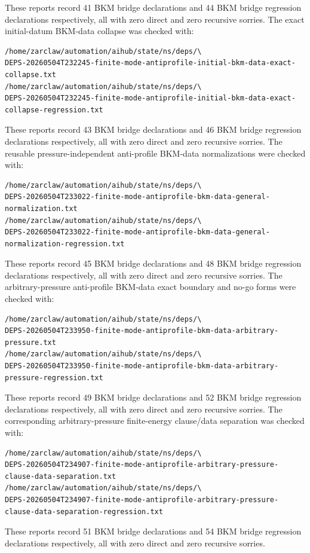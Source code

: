 \documentclass[11pt]{article}
\begin{document}
These reports record 41 BKM bridge declarations and 44 BKM bridge regression
declarations respectively, all with zero direct and zero recursive sorries.
The exact initial-datum BKM-data collapse was checked with:
\begin{verbatim}
/home/zarclaw/automation/aihub/state/ns/deps/\
DEPS-20260504T232245-finite-mode-antiprofile-initial-bkm-data-exact-collapse.txt
/home/zarclaw/automation/aihub/state/ns/deps/\
DEPS-20260504T232245-finite-mode-antiprofile-initial-bkm-data-exact-collapse-regression.txt
\end{verbatim}
These reports record 43 BKM bridge declarations and 46 BKM bridge regression
declarations respectively, all with zero direct and zero recursive sorries.
The reusable pressure-independent anti-profile BKM-data normalizations were
checked with:
\begin{verbatim}
/home/zarclaw/automation/aihub/state/ns/deps/\
DEPS-20260504T233022-finite-mode-antiprofile-bkm-data-general-normalization.txt
/home/zarclaw/automation/aihub/state/ns/deps/\
DEPS-20260504T233022-finite-mode-antiprofile-bkm-data-general-normalization-regression.txt
\end{verbatim}
These reports record 45 BKM bridge declarations and 48 BKM bridge regression
declarations respectively, all with zero direct and zero recursive sorries.
The arbitrary-pressure anti-profile BKM-data exact boundary and no-go forms
were checked with:
\begin{verbatim}
/home/zarclaw/automation/aihub/state/ns/deps/\
DEPS-20260504T233950-finite-mode-antiprofile-bkm-data-arbitrary-pressure.txt
/home/zarclaw/automation/aihub/state/ns/deps/\
DEPS-20260504T233950-finite-mode-antiprofile-bkm-data-arbitrary-pressure-regression.txt
\end{verbatim}
These reports record 49 BKM bridge declarations and 52 BKM bridge regression
declarations respectively, all with zero direct and zero recursive sorries.
The corresponding arbitrary-pressure finite-energy clause/data separation was
checked with:
\begin{verbatim}
/home/zarclaw/automation/aihub/state/ns/deps/\
DEPS-20260504T234907-finite-mode-antiprofile-arbitrary-pressure-clause-data-separation.txt
/home/zarclaw/automation/aihub/state/ns/deps/\
DEPS-20260504T234907-finite-mode-antiprofile-arbitrary-pressure-clause-data-separation-regression.txt
\end{verbatim}
These reports record 51 BKM bridge declarations and 54 BKM bridge regression
declarations respectively, all with zero direct and zero recursive sorries.
\end{document}
